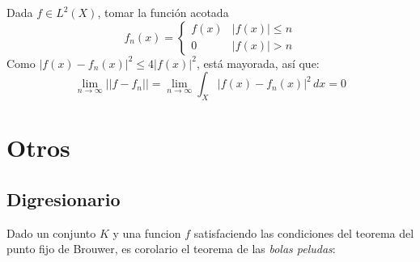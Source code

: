 \documentclass{book}
\begin{document}
\begin{teorema}[$B(X)$ es denso en $L^2(X)$]
    Dada $f \in L^2(X)$, tomar la funci\'on acotada
    $$f_n(x) =
    \begin{cases}
        f(x)    & |f(x)| \leq n\\
        0       & |f(x)| > n
    \end{cases}
    $$
    Como $|f(x) - f_n(x)|^2 \leq 4|f(x)|^2$, est\'a mayorada, as\'i que:
    $$
    \lim_{n\to\infty}||f - f_n|| = \lim_{n\to\infty} \int_X |f(x) - f_n(x)|^2\,dx = 0
    $$
\end{teorema}

\chapter{Otros}
\section{Digresionario}
\begin{teorema}
    Dado un conjunto $K$ y una funcion $f$ satisfaciendo las condiciones del teorema del punto fijo de Brouwer,
    es corolario el teorema de las \textit{bolas peludas}:
\end{teorema}
\end{document}
